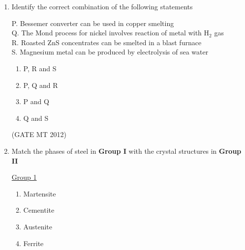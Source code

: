 \documentclass[journal, 11pt, onecolumn]{IEEEtran}
\theoremstyle{remark}
\begin{document}
\begin{enumerate}
\begin{enumerate}
\begin{multicols}{2}
\underline{Group 2}
\begin{enumerate}[label=(\arabic*), start=1]
\item Lead 
\item Copper
\item Aluminium
\item Gold
\end{enumerate}
\end{multicols}

\begin{multicols}{2}
\begin{enumerate}[(A)]
\item P-1, Q-2, R-1, S-4
\item P-2, Q-3, R-1, S-4
\item P-2, Q-1, R-3, S-4
\item P-2, Q-3, R-4, S-1
\end{enumerate}
\end{multicols}
\hfill(GATE MT 2012)

\item Identify the correct combination of the following statements

P. Bessemer converter can be used in copper smelting \\
Q. The Mond process for nickel involves reaction of metal with H$_2$ gas \\
R. Roasted ZnS concentrates can be smelted in a blast furnace \\
S. Magnesium metal can be produced by electrolysis of sea water

\begin{multicols}{2}
\begin{enumerate}  
\item P, R and S
\item P, Q and R
\item P and Q
\item Q and S
\end{enumerate}
\end{multicols}
\hfill(GATE MT 2012)

\item Match the phases of steel in \textbf{Group I} with the crystal structures in \textbf{Group II}
\begin{multicols}{2}
\underline{Group 1}
\begin{enumerate}[label=(\Alph*), start=16]
\item Martensite   
\item Cementite
\item Austenite  
\item Ferrite
\end{enumerate}


\end{multicols}
\end{enumerate}
\end{enumerate}
\end{document}
